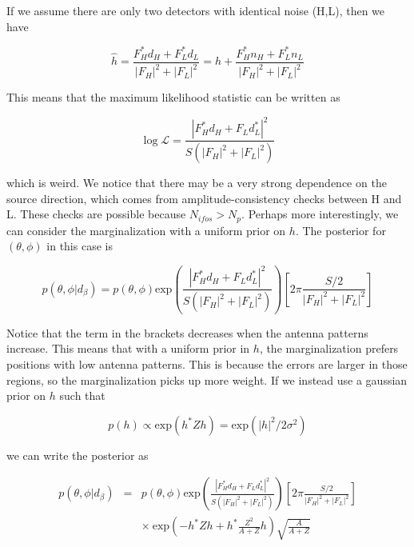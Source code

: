 \documentclass[10pt]{article}
\begin{document}
If we assume there are only two detectors with identical noise (H,L), then we have

\begin{equation}
\hat{h} = \frac{F_H^\ast d_H + F_L^\ast d_L}{|F_H|^2 + |F_L|^2} = h + \frac{F_H^\ast n_H + F_L^\ast n_L}{|F_H|^2 + |F_L|^2} 
\end{equation}

This means that the maximum likelihood statistic can be written as

\begin{equation}
\log \mathcal{L} = \frac{\left|F_H^\ast d_H + F_L d_L^\ast\right|^2}{S\left(|F_H|^2 + |F_L|^2\right)}
\end{equation}

which is weird. We notice that there may be a very strong dependence on the source direction, which comes from amplitude-consistency checks between H and L. These checks are possible because $N_{ifos} > N_{p}$. Perhaps more interestingly, we can consider the marginalization with a uniform prior on $h$. The posterior for $(\theta,\phi)$ in this case is

\begin{equation}
p(\theta,\phi|d_\beta) = p(\theta, \phi) \mathrm{exp}\left( \frac{\left|F_H^\ast d_H + F_L d_L^\ast\right|^2}{S\left(|F_H|^2 + |F_L|^2\right)} \right) \left[2\pi\frac{S/2}{|F_H|^2 + |F_L|^2}\right]
\end{equation}

Notice that the term in the brackets decreases when the antenna patterns increase. This means that with a uniform prior in $h$, the marginalization prefers positions with low antenna patterns. This is because the errors are larger in those regions, so the marginalization picks up more weight. If we instead use a gaussian prior on $h$ such that

\begin{equation}
p(h) \propto \mathrm{exp} \left( h^\ast Z h \right) = \mathrm{exp} \left( |h|^2/2\sigma^2 \right)
\end{equation}

we can write the posterior as

\begin{eqnarray}
p(\theta,\phi|d_\beta) & = & p(\theta, \phi) \mathrm{exp}\left( \frac{\left|F_H^\ast d_H + F_L d_L^\ast\right|^2}{S\left(|F_H|^2 + |F_L|^2\right)} \right) \left[2\pi\frac{S/2}{|F_H|^2 + |F_L|^2}\right] \nonumber \\
                       &   & \times\ \mathrm{exp}\left( -h^\ast Z h + h^\ast\frac{Z^2}{A+Z} h \right)\sqrt{\frac{A}{A+Z}}
\end{eqnarray}
\end{document}
